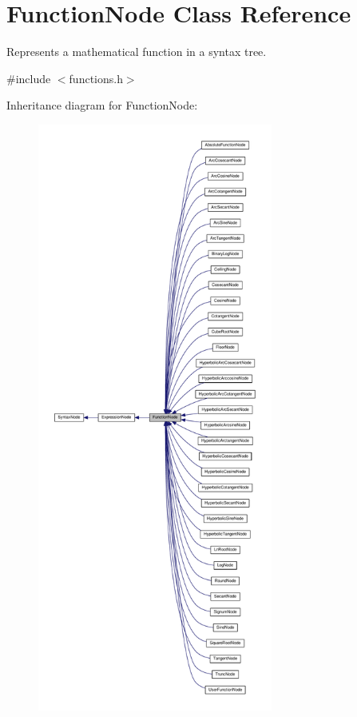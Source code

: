 \hypertarget{classFunctionNode}{}\section{Function\+Node Class Reference}
\label{classFunctionNode}


Represents a mathematical function in a syntax tree.  




{\ttfamily \#include $<$functions.\+h$>$}



Inheritance diagram for Function\+Node\+:
\nopagebreak
\begin{figure}[H]
\begin{center}
\leavevmode
\includegraphics[height=550pt]{d6/d84/classFunctionNode__inherit__graph}
\end{center}
\end{figure}


